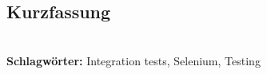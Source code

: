 
\subsection*{Kurzfassung}



%
\mbox{}\\[0.5\baselineskip]\noindent
\textbf{Schlagwörter:} 
Integration tests, Selenium, Testing
